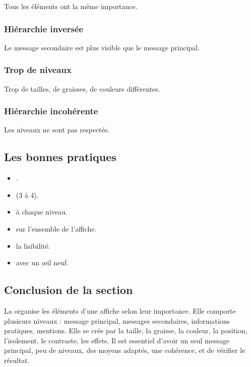 Tous les éléments ont la même importance.

\subsubsection{Hiérarchie inversée}

Le message secondaire est plus visible que le message principal.

\subsubsection{Trop de niveaux}

Trop de tailles, de graisses, de couleurs différentes.

\subsubsection{Hiérarchie incohérente}

Les niveaux ne sont pas respectés.

\subsection{Les bonnes pratiques}

\begin{itemize}
    \item {}.
    \item {} (3 à 4).
    \item {} à chaque niveau.
    \item {} sur l'ensemble de l'affiche.
    \item {} la lisibilité.
    \item {} avec un œil neuf.
\end{itemize}

\subsection*{Conclusion de la section}

La  organise les éléments d'une affiche selon leur importance. Elle comporte plusieurs niveaux : message principal, messages secondaires, informations pratiques, mentions. Elle se crée par la taille, la graisse, la couleur, la position, l'isolement, le contraste, les effets. Il est essentiel d'avoir un seul message principal, peu de niveaux, des moyens adaptés, une cohérence, et de vérifier le résultat.

